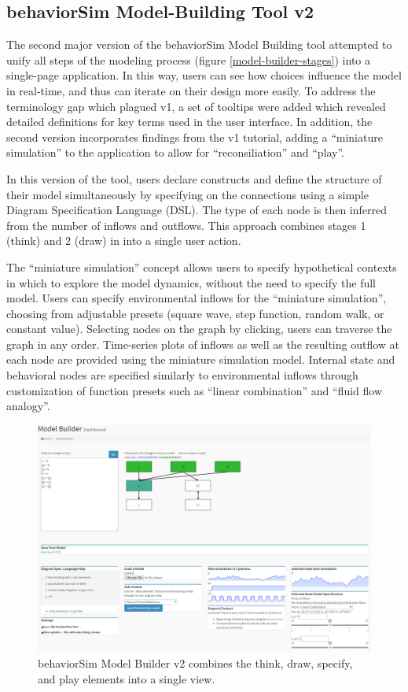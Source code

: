 \documentclass[conference]{IEEEtran}
\begin{document}
\subsection{behaviorSim Model-Building Tool v2}
The second major version of the behaviorSim Model Building tool attempted to unify all steps of the modeling process (figure \ref{model-builder-stages}) into a single-page application.
In this way, users can see how choices influence the model in real-time, and thus can iterate on their design more easily.
To address the terminology gap which plagued v1, a set of tooltips were added which revealed detailed definitions for key terms used in the user interface.
In addition, the second version incorporates findings from the v1 tutorial, adding a ``miniature simulation'' to the application to allow for ``reconsiliation'' and ``play''.

In this version of the tool, users declare constructs and define the structure of their model simultaneously by specifying on the connections using a simple Diagram Specification Language (DSL). 
The type of each node is then inferred from the number of inflows and outflows.
This approach combines stages 1 (think) and 2 (draw) in into a single user action.

The ``miniature simulation'' concept allows users to specify hypothetical contexts in which to explore the model dynamics, without the need to specify the full model.
Users can specify environmental inflows for the ``miniature simulation'', choosing from adjustable presets (square wave, step function, random walk, or constant value).
Selecting nodes on the graph by clicking, users can traverse the graph in any order.
Time-series plots of inflows as well as the resulting outflow at each node are provided using the miniature simulation model.
Internal state and behavioral nodes are specified similarly to environmental inflows through customization of function presets such as ``linear combination'' and ``fluid flow analogy''\cite{martin2014dynamical}.


\begin{figure}[!t]
  \centering
  \includegraphics[width=0.9\columnwidth]{img/v2}  
  \caption{behaviorSim Model Builder v2 combines the think, draw, specify, and play elements into a single view.}
  \label{model-builder-v2}
\end{figure}
\end{document}

